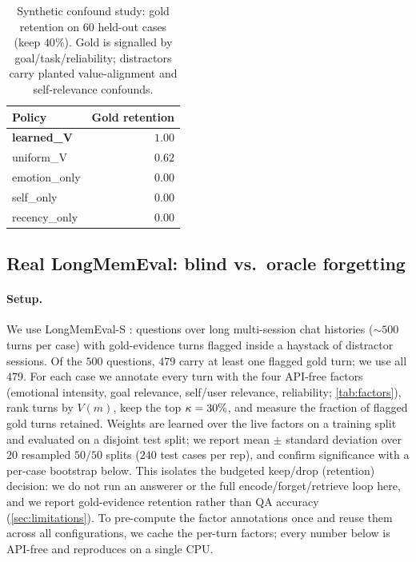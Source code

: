 \begin{table}[ht!]
\centering\small
\caption{Synthetic confound study: gold retention on $60$ held-out cases
(keep $40\%$). Gold is signalled by goal/task/reliability; distractors
carry planted value-alignment and self-relevance confounds.}
\label{tab:synth}
\begin{tabular}{lr}
\toprule
Policy & Gold retention \\
\midrule
\textbf{learned\_V} & $\mathbf{1.00}$ \\
uniform\_V          & $0.62$ \\
emotion\_only       & $0.00$ \\
self\_only          & $0.00$ \\
recency\_only       & $0.00$ \\
\bottomrule
\end{tabular}
\end{table}

\subsection{Real LongMemEval: blind vs.\ oracle forgetting}
\label{sec:exp:blind}

\paragraph{Setup.}
We use LongMemEval-S \citep{wu2025longmemeval}: questions over long
multi-session chat histories ($\sim\!500$ turns per case) with
gold-evidence turns flagged inside a haystack of distractor sessions. Of
the $500$ questions, $479$ carry at least one flagged gold turn; we use
all $479$. For each case we annotate every turn with the four API-free
factors (emotional intensity, goal relevance, self/user relevance,
reliability; \cref{tab:factors}), rank turns by $V(m)$, keep the top
$\kappa=30\%$, and measure the fraction of flagged gold turns
retained. Weights are learned over the live factors on a training split
and evaluated on a disjoint test split; we report mean $\pm$ standard
deviation over $20$ resampled $50/50$ splits ($240$ test cases per rep),
and confirm significance with a per-case bootstrap below. This isolates
the budgeted keep/drop (retention) decision: we do not run an answerer or
the full encode/forget/retrieve loop here, and we report gold-evidence
retention rather than QA accuracy (\cref{sec:limitations}). To pre-compute
the factor annotations once and reuse them across all configurations, we
cache the per-turn factors; every number below is API-free and reproduces
on a single CPU.

